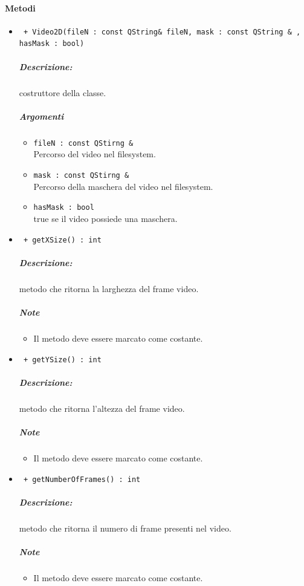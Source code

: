 \paragraph{Metodi\\}
	\begin{itemize}
		\item \color{blue}\verb! + Video2D(fileN : const QString& fileN, mask : const QString & , hasMask : bool)!\\
			\color{black}
			\subparagraph{Descrizione:} costruttore della classe.
			\subparagraph{Argomenti}
				\begin{itemize}
					\item \color{RoyalPurple}\verb!fileN : const QStirng &!\\
					\color{black}Percorso del video nel filesystem.
					\item \color{RoyalPurple}\verb!mask : const QStirng &!\\
					\color{black}Percorso della maschera del video nel filesystem.
					\item \color{RoyalPurple}\verb!hasMask : bool!\\
					\color{black} true se il video possiede una maschera.
				\end{itemize}
				
		\item \color{blue}\verb! + getXSize() : int !\\
		\color{black}
		\subparagraph{Descrizione:} metodo che ritorna la larghezza del frame video.
		\subparagraph{Note}
			\begin{itemize}
				\item Il metodo deve essere marcato come costante.
			\end{itemize}
		
		\item \color{blue}\verb! + getYSize() : int !\\
		\color{black}
		\subparagraph{Descrizione:} metodo che ritorna l'altezza del frame video.
		\subparagraph{Note}
			\begin{itemize}
				\item Il metodo deve essere marcato come costante.
			\end{itemize}
			
		\item \color{blue}\verb! + getNumberOfFrames() : int !\\
		\color{black}
		\subparagraph{Descrizione:} metodo che ritorna il numero di frame presenti nel video.
		\subparagraph{Note}
			\begin{itemize}
				\item Il metodo deve essere marcato come costante.
			\end{itemize}
			

\end{itemize}
